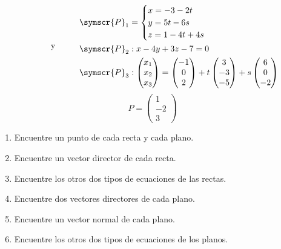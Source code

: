\documentclass{article}
\def\fancyP{\symscr{P}}
\begin{document}
\begin{enumerate}
\[\begin{aligned}
        \end{aligned}
        \hspace{1cm}
        \text{y}
        \hspace{1cm}
        \begin{aligned}
            \fancyP_1 &=
            \begin{cases}
                x = -3 -2t \\
                y = 5t - 6s \\ 
                z = 1 - 4t + 4s
            \end{cases} \\
            \fancyP_2 &:
            x - 4y + 3z - 7 = 0 \\ 
            \fancyP_3 &:
            \begin{pmatrix}x_1 \\ x_2 \\ x_3\end{pmatrix}
            =
            \begin{pmatrix}-1 \\ 0 \\ 2\end{pmatrix}
            + t\begin{pmatrix}3 \\ -3 \\ -5\end{pmatrix}
            + s\begin{pmatrix}6 \\ 0 \\ -2\end{pmatrix}
        \end{aligned}
    \]
    \[
        P = \begin{pmatrix}
            1 \\ -2 \\ 3
        \end{pmatrix}
    \]
    \begin{enumerate}[label=\listAlph]
		\item Encuentre un punto de cada recta y cada plano.
		\item Encuentre un vector director de cada recta.
		\item Encuentre los otros dos tipos de ecuaciones de las rectas.
		\item Encuentre dos vectores directores de cada plano.
		\item Encuentre un vector normal de cada plano.
		\item Encuentre los otros dos tipos de ecuaciones de los planos.

\end{enumerate}
\end{enumerate}
\end{document}
